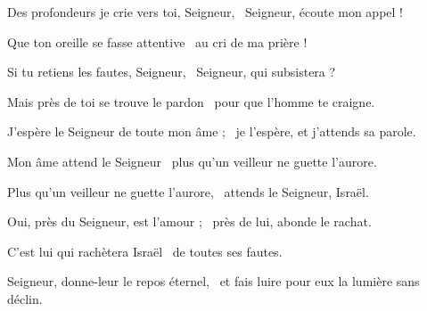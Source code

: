 \item Des profondeurs je crie vers toi, Seigneur,~\psstar{} Seigneur, écoute mon appel !

\item Que ton oreille se fasse attentive~\psstar{} au cri de ma prière !

\item Si tu retiens les fautes, Seigneur,~\psstar{} Seigneur, qui subsistera ?

\item Mais près de toi se trouve le pardon~\psstar{} pour que l'homme te craigne.

\item J'espère le Seigneur de toute mon âme ;~\psstar{} je l'espère, et j'attends sa parole.

\item Mon âme attend le Seigneur~\psstar{} plus qu'un veilleur ne guette l'aurore.

\item Plus qu'un veilleur ne guette l'aurore,~\psstar{} attends le Seigneur, Israël.

\item Oui, près du Seigneur, est l'amour ;~\psstar{} près de lui, abonde le rachat.

\item C'est lui qui rachètera Israël~\psstar{} de toutes ses fautes.

\item Seigneur, donne-leur le repos éternel,~\psstar{} et fais luire pour eux la lumière sans déclin.